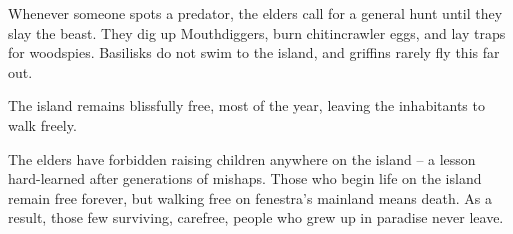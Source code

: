 \begin{multicols}{2}
\begin{exampletext}
  Whenever someone spots a predator, the elders call for a general hunt until they slay the beast.
  They dig up Mouthdiggers, burn chitincrawler eggs, and lay traps for woodspies.
  Basilisks do not swim to the island, and griffins rarely fly this far out.

  The island remains blissfully free, most of the year, leaving the inhabitants to walk freely.

  The elders have forbidden raising children anywhere on the island -- a lesson hard-learned after generations of mishaps.
  Those who begin life on the island remain free forever, but walking free on \gls{fenestra}'s mainland means death.
  As a result, those few surviving, carefree, people who grew up in paradise never leave.
\end{exampletext}

\end{multicols}
